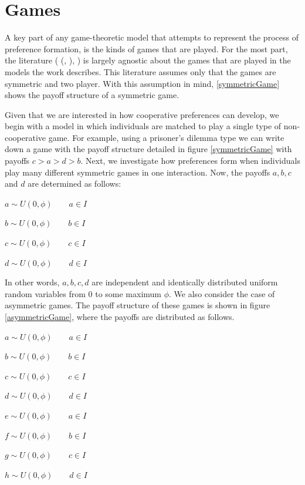 \documentclass[11pt]{book}
\newcommand*{\np}{\par\noindent\newline}
\begin{document}
\section{Games}
\np A key part of any game-theoretic model that attempts to represent the process of preference formation, is the kinds of games that are played.
For the most part, the literature (\citeauthor{alger_generalization_2012} (\citeyear{alger_generalization_2012}, \citeyear{alger_homo_2013}), \citet{newton_preferences_2017}) is largely agnostic about the games that are played in the models the work describes.
This literature assumes only that the games are symmetric and two player. 
With this assumption in mind, \ref{symmetricGame} shows the payoff structure of a symmetric game.

\np Given that we are interested in how cooperative preferences can develop, we begin with a model in which individuals are matched to play a single type of non-cooperative game.
For example, using a prisoner's dilemma type we can write down a game with the payoff structure detailed in figure \ref{symmetricGame} with payoffs $c > a > d > b$.
Next, we investigate how preferences form when individuals play many different symmetric games in one interaction.
Now, the payoffs $a, b, c$ and $d$ are determined as follows:

\begin{center}\label{a_through_d}	
$a \sim U(0,\phi) \qquad a \in I$

$b \sim U(0,\phi) \qquad b \in I$

$c \sim U(0,\phi) \qquad c \in I$

$d \sim U(0,\phi) \qquad d \in I$
\end{center}

\np In other words, $a, b, c, d$ are independent and identically distributed uniform random variables from $0$ to some maximum $\phi$.
We also consider the case of asymmetric games. The payoff structure of these games is shown in figure \ref{asymmetricGame}, where the payoffs are distributed as follows.
\begin{center}\label{a_through_d}	
	$a \sim U(0,\phi) \qquad a \in I$
	
	$b \sim U(0,\phi) \qquad b \in I$
	
	$c \sim U(0,\phi) \qquad c \in I$
	
	$d \sim U(0,\phi) \qquad d \in I$

	$e \sim U(0,\phi) \qquad a \in I$
	
	$f \sim U(0,\phi) \qquad b \in I$
	
	$g \sim U(0,\phi) \qquad c \in I$
	
	$h \sim U(0,\phi) \qquad d \in I$
\end{center}
\end{document}

